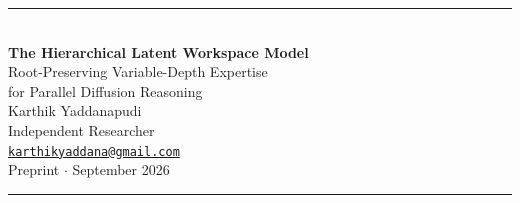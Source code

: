 \documentclass[10pt,a4paper]{article}
\begin{document}
\begin{center}
{\color{navy}\rule{\textwidth}{1.2pt}}\\[1.3em]
{\huge\bfseries The Hierarchical Latent Workspace Model}\\[0.55em]
{\LARGE\color{accent} Root-Preserving Variable-Depth Expertise\\[0.15em] for Parallel Diffusion Reasoning}\\[1.2em]
{\large Karthik Yaddanapudi}\\[0.25em]
{\normalsize Independent Researcher\\[0.1em]
\href{mailto:karthikyaddana@gmail.com}{\texttt{karthikyaddana@gmail.com}}}\\[0.8em]
{\normalsize Preprint \;\;$\cdot$\; September 2026}\\[1.2em]
{\color{navy}\rule{\textwidth}{1.2pt}}
\end{center}
\vspace{0.8em}
\end{document}
